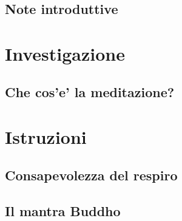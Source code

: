 \documentclass[11pt,twoside,draft]{memoir}
\begin{document}

\mainmatter*


\newpage
\thispagestyle{empty}
\vspace*{8\baselineskip}
{\centering
\booktitlefont
\MakeUppercase{}\\
\MakeUppercase{}
\par
}
\vfil

\setcounter{chapter}{0}


\chapter{Note introduttive}



\part{Investigazione}

\chapter{Che cos'e' la meditazione?}



\part{Istruzioni}

\chapter{Consapevolezza del respiro}


\chapter{Il mantra Buddho}

\end{document}
